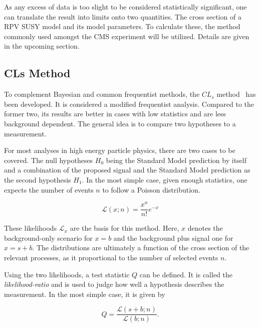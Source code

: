 As any excess of data is too slight to be considered statistically significant, one can translate the result into limits onto two quantities. The cross section of a RPV SUSY model and its model parameters. To calculate these, the method commonly used amongst the CMS experiment will be utilized. Details are given in the upcoming section.


\subsection{CLs Method}
\label{sec:cls-method}

To complement Bayesian and common frequentist methods, the $CL_s$ method~\cite{cls,cls2} has been developed. It is considered a modified frequentist analysis. Compared to the former two, its results are better in cases with low statistics and are less background dependent. The general idea is to compare two hypotheses to a measurement.


For most analyses in high energy particle physics, there are two cases to be covered. The null hypotheses $H_0$ being the Standard Model prediction by itself and a combination of the proposed signal and the Standard Model prediction as the second hypothesis $H_1$. In the most simple case, given enough statistics, one expects the number of events $n$ to follow a Poisson distribution.

\begin{equation}
  \label{eq:poisson-likelihood}
    \mathcal{L} (x; n) = \frac{x^n}{n!} e^{-x}
\end{equation}

\noindent These likelihoods $\mathcal{L}_x$ are the basis for this method. Here, $x$ denotes the background-only scenario for $x = b$ and the background plus signal one for $x = s + b$. The distributions are ultimately a function of the cross section of the relevant processes, as it proportional to the number of selected events $n$.

Using the two likelihoods, a test statistic $Q$ can be defined. It is called the \textit{likelihood-ratio} and is used to judge how well a hypothesis describes the measurement. In the most simple case, it is given by

\begin{equation}
  \label{eq:testq}
  Q = \frac{\mathcal{L} (s + b; n)}{\mathcal{L} (b; n)}.
\end{equation}

